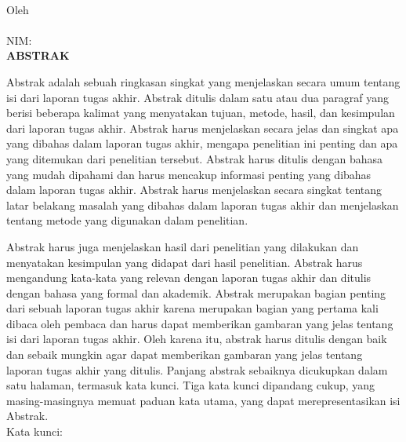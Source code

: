 \clearpage
{}
{}
\begin{center}
    \textbf{\large{\judulid}}\\[0.5cm]
    Oleh\\
    \penulis\\
    NIM: \nim\\[2em]
    \textbf{ABSTRAK}\\[0.5cm]
\end{center}

Abstrak adalah sebuah ringkasan singkat yang menjelaskan secara umum tentang isi dari laporan tugas akhir. Abstrak ditulis dalam satu atau dua paragraf yang berisi beberapa kalimat yang menyatakan tujuan, metode, hasil, dan kesimpulan dari laporan tugas akhir. Abstrak harus menjelaskan secara jelas dan singkat apa yang dibahas dalam laporan tugas akhir, mengapa penelitian ini penting dan apa yang ditemukan dari penelitian tersebut. Abstrak harus ditulis dengan bahasa yang mudah dipahami dan harus mencakup informasi penting yang dibahas dalam laporan tugas akhir. Abstrak harus menjelaskan secara singkat tentang latar belakang masalah yang dibahas dalam laporan tugas akhir dan menjelaskan tentang metode yang digunakan dalam penelitian.

Abstrak harus juga menjelaskan hasil dari penelitian yang dilakukan dan menyatakan kesimpulan yang didapat dari hasil penelitian. Abstrak harus mengandung kata-kata yang relevan dengan laporan tugas akhir dan ditulis dengan bahasa yang formal dan akademik. Abstrak merupakan bagian penting dari sebuah laporan tugas akhir karena merupakan bagian yang pertama kali dibaca oleh pembaca dan harus dapat memberikan gambaran yang jelas tentang isi dari laporan tugas akhir. Oleh karena itu, abstrak harus ditulis dengan baik dan sebaik mungkin agar dapat memberikan gambaran yang jelas tentang laporan tugas akhir yang ditulis. Panjang abstrak sebaiknya dicukupkan dalam satu halaman, termasuk kata kunci. Tiga kata kunci dipandang cukup, yang masing-masingnya memuat paduan kata utama, yang dapat merepresentasikan isi Abstrak.\\[0.75cm]

\noindent Kata kunci: \katakunci